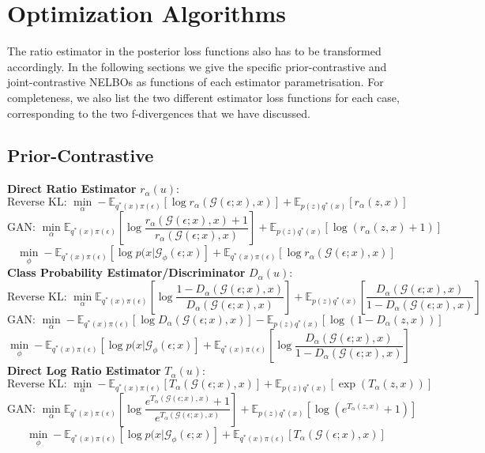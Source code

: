 \documentclass[honours,12pt]{unswthesis}
\newcommand{\E}{\mathbb{E}}
\numberwithin{equation}{section}
\theoremstyle{definition}
\begin{document}
\section{Optimization Algorithms}
The ratio estimator in the posterior loss functions also has to be transformed accordingly. In the following sections we give the specific prior-contrastive and joint-contrastive NELBOs as functions of each estimator parametrisation. For completeness, we also list the two different estimator loss functions for each case, corresponding to the two f-divergences that we have discussed.
\subsection{Prior-Contrastive}
\textbf{Direct Ratio Estimator} $r_\alpha(u)$:
\[\text{Reverse KL: }\min_\alpha -\E_{q^*(x)\pi(\epsilon)}[\log r_\alpha(\mathcal{G}(\epsilon;x),x)]+\E_{p(z)q^*(x)}[r_\alpha(z,x)]\]
\[\text{GAN: }\min_\alpha \E_{q^*(x)\pi(\epsilon)}\left[\log \frac{r_\alpha(\mathcal{G}(\epsilon;x),x)+1}{r_\alpha(\mathcal{G}(\epsilon;x),x)}\right]+\E_{p(z)q^*(x)}[\log(r_\alpha(z,x)+1)]\]
\[\min_\phi-\E_{q^*(x)\pi(\epsilon)}[\log p(x|\mathcal{G}_\phi(\epsilon;x)]+\E_{q^*(x)\pi(\epsilon)}[\log r_\alpha(\mathcal{G}(\epsilon;x),x)]\]
\textbf{Class Probability Estimator/Discriminator} $D_\alpha(u)$:
\[\text{Reverse KL: }\min_\alpha \E_{q^*(x)\pi(\epsilon)}\left[\log \frac{1-D_\alpha(\mathcal{G}(\epsilon;x),x)}{D_\alpha(\mathcal{G}(\epsilon;x),x)}\right]+\E_{p(z)q^*(x)}\left[\frac{D_\alpha(\mathcal{G}(\epsilon;x),x)}{1-D_\alpha(\mathcal{G}(\epsilon;x),x)}\right]\]
\[\text{GAN: }\min_\alpha -\E_{q^*(x)\pi(\epsilon)}[\log D_\alpha(\mathcal{G}(\epsilon;x),x)]-\E_{p(z)q^*(x)}[\log(1-D_\alpha(z,x))]\]
\[\min_\phi-\E_{q^*(x)\pi(\epsilon)}[\log p(x|\mathcal{G}_\phi(\epsilon;x)]+\E_{q^*(x)\pi(\epsilon)}\left[\log \frac{D_\alpha(\mathcal{G}(\epsilon;x),x)}{1-D_\alpha(\mathcal{G}(\epsilon;x),x)}\right]\]
\textbf{Direct Log Ratio Estimator} $T_\alpha(u)$:
\[\text{Reverse KL: }\min_\alpha -\E_{q^*(x)\pi(\epsilon)}[T_\alpha(\mathcal{G}(\epsilon;x),x)]+\E_{p(z)q^*(x)}[\exp(T_\alpha(z,x))]\]
\[\text{GAN: }\min_\alpha \E_{q^*(x)\pi(\epsilon)}\left[\log \frac{e^{T_\alpha(\mathcal{G}(\epsilon;x),x)}+1}{e^{T_\alpha(\mathcal{G}(\epsilon;x),x)}}\right]+\E_{p(z)q^*(x)}[\log(e^{T_\alpha(z,x)}+1)]\]
\[\min_\phi-\E_{q^*(x)\pi(\epsilon)}[\log p(x|\mathcal{G}_\phi(\epsilon;x)]+\E_{q^*(x)\pi(\epsilon)}[T_\alpha(\mathcal{G}(\epsilon;x),x)]\]
\end{document}

